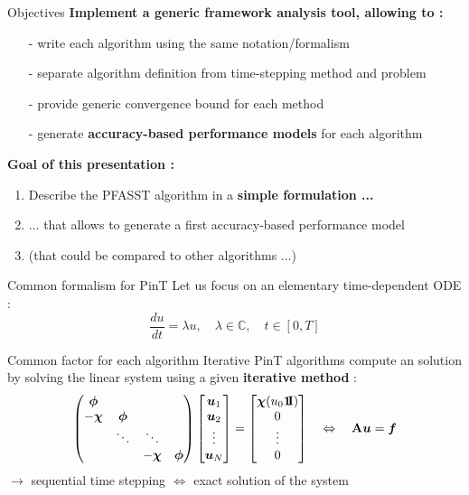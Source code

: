 \documentclass[11pt,aspectratio=43]{beamer}
\newcommand{\ones}{\mbox{1\hspace{-0.2em}I}}
\newcommand{\matr}[1]{\mathbf{#1}}
\newcommand{\vect}[1]{\boldsymbol{#1}}
\newcommand{\uvect}{\vect{u}}
\begin{document}
\begin{frame}{Objectives}
	\textbf{Implement a generic framework analysis tool, allowing to :}
    \begin{enumerate}
        \item[-] write each algorithm using the same notation/formalism
        \item[-] separate algorithm definition from time-stepping method and problem
        \item[-] provide generic convergence bound for each method
        \item[-] generate \textbf{accuracy-based performance models} for each algorithm
    \end{enumerate}\vskip30pt
	
	\textbf{Goal of this presentation :}
	\begin{enumerate}
		\item Describe the PFASST algorithm in a \textbf{simple formulation ...}
		\item ... that allows to generate a first accuracy-based performance model
		\item (that could be compared to other algorithms ...)
	\end{enumerate}
\end{frame}

\begin{frame}{Common formalism for PinT}\vskip10pt
	Let us focus on an elementary time-dependent ODE :
	$$\frac{du}{dt} = \lambda u, \quad \lambda \in \mathbb{C}, 
	\quad t \in [0,T]
	$$
    \begin{block}{Common factor for each algorithm}
    Iterative PinT algorithms compute an solution by solving the linear system
    using a given \textbf{iterative method} :
    $$
    \begin{pmatrix}
        \bm{\phi} & & &\\
        -\bm{\chi} & \bm{\phi} & &\\
        & \ddots & \ddots &\\
        & & -\bm{\chi} & \bm{\phi}
    \end{pmatrix}
    \begin{bmatrix}
        \uvect_1\\\uvect_2\\\vdots\\\uvect_N
    \end{bmatrix}
    =
    \begin{bmatrix}
        \bm{\chi}(u_0\vect{\ones})\\0\\\vdots\\0
    \end{bmatrix}
    \quad \Leftrightarrow \quad 
    \matr{A}\uvect = \vect{f}$$
    $\rightarrow$ sequential time stepping $\Leftrightarrow$ exact solution of the system
    \end{block}
\end{frame}
\end{document}
